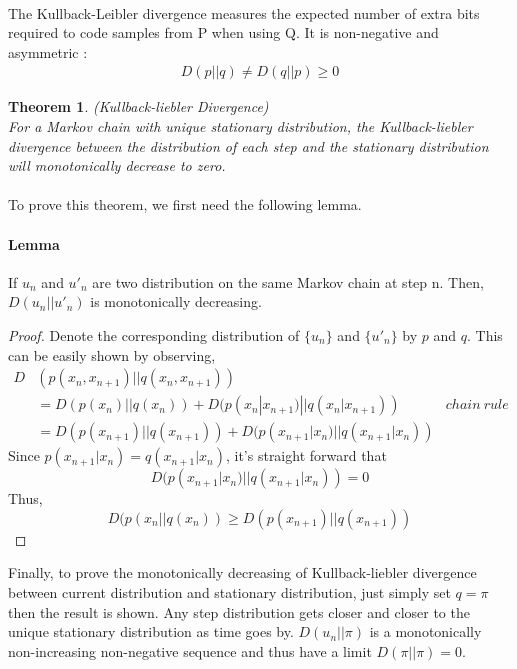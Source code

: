 \documentclass[a4paper, 11pt]{article} %
\newtheorem*{theorem*}{Theorem}
\begin{document}
\paragraph{}
The Kullback-Leibler divergence measures the expected number of extra bits required to code samples from P when using Q.
 It is non-negative and asymmetric : 
\begin{align*} 
 D(p||q)\neq D(q||p)\geq 0
  \end{align*}
  
\begin{theorem*}
\emph{(Kullback-liebler Divergence)}\\
For a Markov chain with unique stationary distribution, the Kullback-liebler divergence between the distribution of each step and the stationary distribution will monotonically decrease to zero.
\end{theorem*} 
\paragraph{}
To prove this theorem, we first need the following lemma.
\paragraph{Lemma}
If $u_n$ and $u'_n$ are two distribution on the same Markov chain at step n. Then, $D(u_n||u'_n)$ is monotonically decreasing.
\begin{proof}
Denote the corresponding distribution of $\{u_n\}$ and $\{u'_n\}$ by $p$ and $q$. This can be easily shown by observing,
\begin{align*}
D&(p(x_n,x_{n+1})||q(x_n,x_{n+1}))\\
&=D(p(x_n)||q(x_n)) + D(p(x_n|x_{n+1})||q(x_n|x_{n+1})) &chain ~rule \\
&=D(p(x_{n+1})||q(x_{n+1})) + D(p(x_{n+1}|x_n)||q(x_{n+1}|x_n))
\end{align*}
Since $p(x_{n+1}|x_n)=q(x_{n+1}|x_n)$, it's straight forward that
\begin{equation*}
D(p(x_{n+1}|x_n)||q(x_{n+1}|x_n)) = 0
\end{equation*}
Thus,
\begin{equation*}
D(p(x_n||q(x_n)) \geq D(p(x_{n+1})||q(x_{n+1}))
\end{equation*}
\end{proof}
Finally, to prove the monotonically decreasing of Kullback-liebler divergence between current distribution and stationary distribution, just simply set $q=\pi$ then the result is shown.
Any step distribution gets closer and closer to the unique stationary distribution as time goes by. $D(u_{n}||\pi)$ is a monotonically non-increasing non-negative sequence and thus have a limit $D(\pi||\pi)=0$.  
\end{document}
